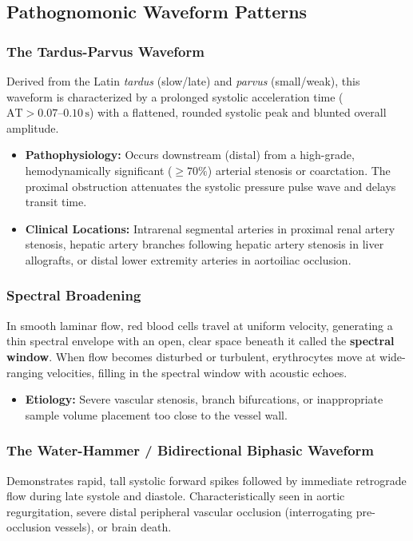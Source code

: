 \documentclass[11pt,a4paper]{article}
\begin{document}
\subsection{Pathognomonic Waveform Patterns}

\subsubsection{The Tardus-Parvus Waveform}
Derived from the Latin \textit{tardus} (slow/late) and \textit{parvus} (small/weak), this waveform is characterized by a prolonged systolic acceleration time ($\text{AT} > 0.07\text{--}0.10\,\text{s}$) with a flattened, rounded systolic peak and blunted overall amplitude.
\begin{itemize}[leftmargin=*]
    \item \textbf{Pathophysiology:} Occurs downstream (distal) from a high-grade, hemodynamically significant ($\ge 70\%$) arterial stenosis or coarctation. The proximal obstruction attenuates the systolic pressure pulse wave and delays transit time.
    \item \textbf{Clinical Locations:} Intrarenal segmental arteries in proximal renal artery stenosis, hepatic artery branches following hepatic artery stenosis in liver allografts, or distal lower extremity arteries in aortoiliac occlusion.
\end{itemize}

\subsubsection{Spectral Broadening}
In smooth laminar flow, red blood cells travel at uniform velocity, generating a thin spectral envelope with an open, clear space beneath it called the \textbf{spectral window}. When flow becomes disturbed or turbulent, erythrocytes move at wide-ranging velocities, filling in the spectral window with acoustic echoes.
\begin{itemize}[leftmargin=*]
    \item \textbf{Etiology:} Severe vascular stenosis, branch bifurcations, or inappropriate sample volume placement too close to the vessel wall.
\end{itemize}

\subsubsection{The Water-Hammer / Bidirectional Biphasic Waveform}
Demonstrates rapid, tall systolic forward spikes followed by immediate retrograde flow during late systole and diastole. Characteristically seen in aortic regurgitation, severe distal peripheral vascular occlusion (interrogating pre-occlusion vessels), or brain death.
\end{document}
